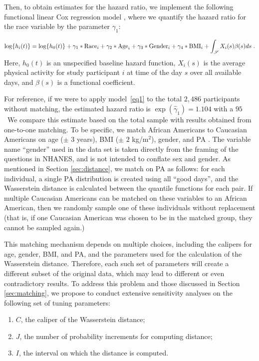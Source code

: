 Then, to obtain estimates for the hazard ratio, we implement the following functional linear Cox regression model \cite{cox_regression_1972,cui_functional_2024,gellar_cox_2015,kong_flcrm_2018}, where we quantify the hazard ratio for the race variable by the parameter $\gamma_1$:  

\begin{equation}
    \log\{h_i(t)\}=\log\{h_0(t)\}+\gamma_1*{\rm Race}_i+\gamma_2*{\rm Age}_i+\gamma_3*{\rm Gender}_i+\gamma_4*{\rm BMI}_i+\int_\mathscr{S} X_i(s)\beta(s)ds\;.
    \label{eq1}
\end{equation}
Here, $h_0(t)$ is an unspecified baseline hazard function, $X_i(s)$ is the average physical activity for study participant $i$ at time of the day $s$ over all available days, and $\beta(s)$ is a functional coefficient.

For reference, if we were to apply model~\eqref{eq1} to the total $2{,}486$ participants without matching, the estimated hazard ratio is 
$\exp{(\widehat{\gamma}_1)}=1.104$ with a $95$\
We compare this estimate based on the total sample with results obtained from one-to-one matching. To be specific, we match African Americans to Caucasian Americans on age ($\pm$ 3 years), BMI ($\pm$ $2$ kg/m$^2$), gender, and PA \cite{leroux_quantifying_2020,smirnova_predictive_2020}. The variable name ``gender'' used in the data set is taken directly from the framing of the questions in NHANES, and is not intended to conflate sex and gender.  As mentioned in Section \ref{sec:distance}, we match on PA as follows: for each individual, a single PA distribution is created using all ``good days'', and the Wasserstein distance is calculated between the quantile functions for each pair. If multiple Caucasian Americans can be matched on these variables to an African American, then we randomly sample one of these individuals without replacement (that is, if one Caucasian American was chosen to be in the matched group, they cannot be sampled again.) 

This matching mechanism depends on multiple choices, including the calipers for age, gender, BMI, and PA, and the parameters used for the calculation of the Wasserstein distance. Therefore, each such set of parameters will create a different subset of the original data, which may lead to different or even contradictory results. To address this problem and those discussed in Section \ref{sec:matching}, we propose to conduct extensive sensitivity analyses on the following set of tuning parameters:

\begin{enumerate}
    \item $C$, the caliper of the Wasserstein distance;
    \item $J$, the number of probability increments for computing distance;
    \item $I$, the interval on which the distance is computed.
\end{enumerate}

